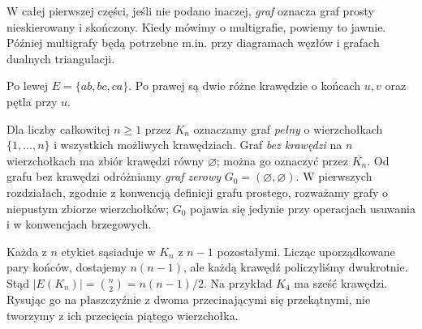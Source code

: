 W całej pierwszej części, jeśli nie podano inaczej, \emph{graf} oznacza
graf prosty nieskierowany i skończony. Kiedy mówimy o multigrafie,
powiemy to jawnie. Później multigrafy będą potrzebne m.in.
przy diagramach węzłów i grafach dualnych triangulacji.

\begin{center}

{\footnotesize Po lewej $E=\{ab,bc,ca\}$. Po prawej są dwie różne
krawędzie o końcach $u,v$ oraz pętla przy $u$.}
\end{center}

\begin{definicja}
Dla liczby całkowitej $n\ge 1$ przez $K_n$ oznaczamy graf
\emph{pełny} o wierzchołkach $\{1,\ldots,n\}$ i wszystkich
możliwych krawędziach. Graf \emph{bez krawędzi} na $n$
wierzchołkach ma zbiór krawędzi równy $\varnothing$;
można go oznaczyć przez $\overline{K_n}$.
Od grafu bez krawędzi odróżniamy \emph{graf zerowy}
$G_0=(\varnothing,\varnothing)$. W pierwszych rozdziałach,
zgodnie z konwencją definicji grafu prostego, rozważamy
grafy o niepustym zbiorze wierzchołków; $G_0$ pojawia się
jedynie przy operacjach usuwania i w konwencjach brzegowych.
\end{definicja}

\begin{przyklad}
Każda z $n$ etykiet sąsiaduje w $K_n$ z $n-1$ pozostałymi.
Licząc uporządkowane pary końców, dostajemy $n(n-1)$,
ale każdą krawędź policzyliśmy dwukrotnie. Stąd
$|E(K_n)|=\binom n2=n(n-1)/2$.
Na przykład $K_4$ ma sześć krawędzi. Rysując go na płaszczyźnie
z dwoma przecinającymi się przekątnymi, nie tworzymy z ich
przecięcia piątego wierzchołka.
\end{przyklad}

